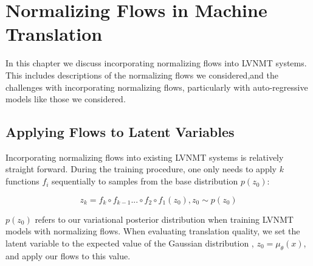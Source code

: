 \chapter{Normalizing Flows in Machine Translation}


In this chapter we discuss incorporating normalizing flows into \ac{LVNMT} systems. This includes descriptions of the normalizing flows we considered,and the challenges with incorporating normalizing flows, particularly with auto-regressive models like those we considered.

\section{Applying Flows to Latent Variables}


Incorporating normalizing flows into existing \ac{LVNMT} systems is relatively straight forward. During the training procedure, one only needs to apply $k$ functions $f_{i}$ sequentially to samples from the base distribution $p(z_{0})$: 

\begin{equation}
z_{k} = f_{k} \circ f_{k-1} ... \circ f_{2} \circ f_{1}(z_{0}) , z_{0} \sim p(z_{0})
\end{equation}

$p(z_{0})$ refers to our variational posterior distribution when training \ac{LVNMT} models with normalizing flows. When evaluating translation quality, we set the latent variable to the expected value of the Gaussian distribution , $z_{0} = \mu_{\theta}(x)$, and apply our flows to this value.


